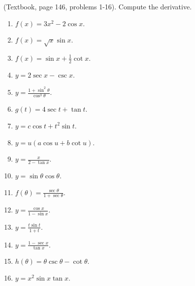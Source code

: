 
(Textbook, page 146, problems 1-16).
Compute the derivative.
\begin{multicols}{2}
\begin{enumerate}
\item $\displaystyle f(x)= 3x^2 -2 \cos x$.

\item $\displaystyle f(x)=\sqrt{x}\sin x$.

\item $\displaystyle f(x)=\sin x +\frac{1}{2}\cot x$.

\item $\displaystyle y=2\sec x - \csc x$.

\item $\displaystyle y=\frac{1+\sin^2\theta}{\cos^3\theta}$.

\item $\displaystyle g(t)=4 \sec t + \tan t$.

\item $\displaystyle y= c\cos t + t^2\sin t$.

\item $\displaystyle y=u(a\cos u + b \cot u)$.

\item $\displaystyle y=\frac{x}{2-\tan x}$.

\item $\displaystyle y=\sin \theta \cos \theta$.

\answer{$\cos (2\theta)= \cos^2\theta- \sin^2\theta$}
\item $\displaystyle f(\theta)=\frac{\sec \theta}{1+\sec \theta}$.

\item $\displaystyle y=\frac{\cos x}{1-\sin x}$.

\item $\displaystyle y=\frac{t\sin t}{1+t}$.

\item $\displaystyle y=\frac{1-\sec x}{\tan x}$.

\item $\displaystyle h(\theta)=\theta \csc \theta -\cot \theta$.

\item $\displaystyle y=x^2\sin x\tan x$.

\end{enumerate}
\end{multicols}
